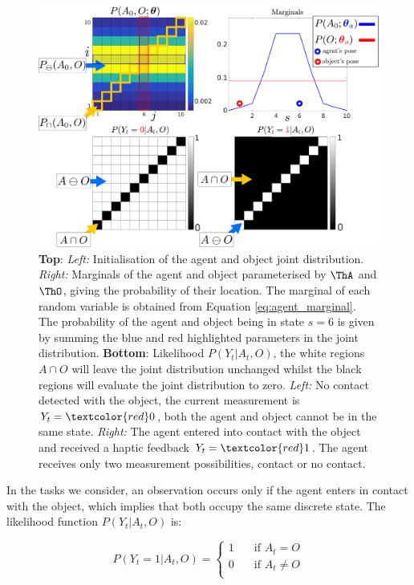 \begin{figure}
 \centering
 \hspace*{-0.8cm}
 \includegraphics[width=1.2\textwidth]{./ch5-MLMF/Figures/explenation/hist_SLAM_likelihood.pdf}
 \caption{\textbf{Top}: \textit{Left:} Initialisation of the agent and object joint distribution. 
 \textit{Right:} Marginals of the agent and object parameterised by $\ThA$ and $\ThO$, giving the probability of their location. The marginal of each 
 random variable is obtained from Equation \ref{eq:agent_marginal}. The probability of
 the agent and object being in state $s=6$ is given by summing the blue and red highlighted parameters in the joint distribution. 
 \textbf{Bottom}: Likelihood $P(Y_t|A_t,O)$, the white regions $A \cap O$ will leave the joint distribution unchanged whilst
 the black regions will evaluate the joint distribution to zero. \textit{Left:} No contact detected with the object, the current measurement 
 is $Y_t = \textcolor{red}0$, both the agent and object cannot be in the same state. \textit{Right:} The agent 
 entered into contact with the object and received a haptic feedback $Y_t = \textcolor{red}1$. The agent receives 
 only two measurement possibilities, contact or no contact.
 }
 \label{fig:histogram_joint}
\end{figure}

In the tasks we consider, an observation occurs only if the agent enters in contact with the object, which implies that both
occupy the same discrete state. The likelihood function $P(Y_t|A_t,O)$ is:

\begin{equation} \label{eq:ch5:discrete_likelihoood}
P(Y_t=1|A_t,O) =
  \begin{cases}
    1       & \quad \text{if } A_t = O     \\
    0  	    & \quad \text{if } A_t \not= O \\
  \end{cases}
\end{equation}

